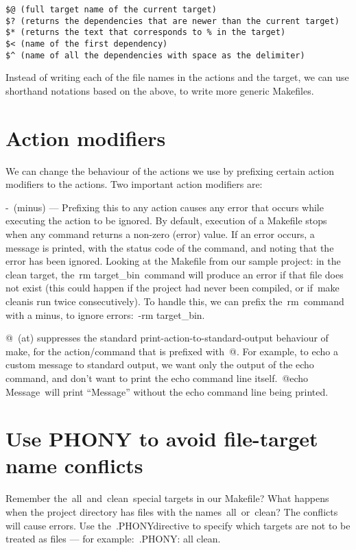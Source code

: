 \documentclass[12pt]{article}
\begin{document}
\begin{verbatim}
$@ (full target name of the current target)
$? (returns the dependencies that are newer than the current target)
$* (returns the text that corresponds to % in the target)
$< (name of the first dependency)
$^ (name of all the dependencies with space as the delimiter)
\end{verbatim}

Instead of writing each of the file names in the actions and the target, we can use shorthand notations based on the above, to write more generic Makefiles.

\section *{Action modifiers}

We can change the behaviour of the actions we use by prefixing certain action modifiers to the actions. Two important action modifiers are:

- (minus) — Prefixing this to any action causes any error that occurs while executing the action to be ignored. By default, execution of a Makefile stops when any command returns a non-zero (error) value. If an error occurs, a message is printed, with the status code of the command, and noting that the error has been ignored. Looking at the Makefile from our sample project: in the clean target, the rm target\_bin command will produce an error if that file does not exist (this could happen if the project had never been compiled, or if make cleanis run twice consecutively). To handle this, we can prefix the rm command with a minus, to ignore errors: -rm target\_bin.

@ (at) suppresses the standard print-action-to-standard-output behaviour of make, for the action/command that is prefixed with @. For example, to echo a custom message to standard output, we want only the output of the echo command, and don’t want to print the echo command line itself. @echo Message will print “Message” without the echo command line being printed.

\section *{Use PHONY to avoid file-target name conflicts}

Remember the all and clean special targets in our Makefile? What happens when the project directory has files with the names all or clean? The conflicts will cause errors. Use the .PHONYdirective to specify which targets are not to be treated as files — for example: .PHONY: all clean.
\end{document}
